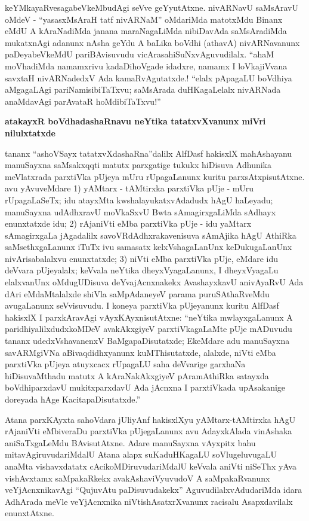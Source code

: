 keYMkayaRvesagabeVkeMbudAgi seVve geYyutAtxne. nivARNavU saMsAravU oMdeV - ``yasasxMsAraH tatf \hbox{nivARNaM}'' oMdariMda matotxMdu Binanx eMdU A kAraNadiMda janana maraNagaLiMda nibiDavAda saMsAradiMda mukatxnAgi adanunx nAsha geYdu A baLika boVdhi (athavA) nivARNavanunx paDeyabeVkeMdU pariBAvisuvudu vicArasahiSuNxvAguvudilalx. ``ahaM moVhadiMda namamxrivu kadaDihoVgade idadxre, namamx I loVkajiVvana savxtaH nivARNadedxV Ada kamaR\-vAgutatxde.! ``elalx pApagaLU boVdhiya aMgagaLAgi pariNamisibiTaTxvu; saMsArada duHKagaLelalx nivARNada anaMdavAgi parAvataR hoMdibiTaTxvu!''

\smallskip
\begin{center}
{\Large\bf atakayxR boVdhadashaRnavu neYtika tatatxvXvanunx miVri nilulxtatxde}
\end{center}

tananx ``ashoVSayx tatatxvXdashaRna''dalilx AlfDasf hakisxlX mahAshayanu manuSayxna saMsakxqqti matutx parxgatige tukukx hiDisuva Adhunika meVlatxrada parxtiVka pUjeya mUru rUpagaLanunx kuritu parxsAtxpisutAtxne. avu yAvuveMdare {\rm 1)} yAMtarx - tAMtirxka parxtiVka pUje - mUru rUpagaLaSeTx; idu atayxMta kwshalayukatxvAdadudx hAgU haLeyadu; manuSayxna udAdhxravU moVkaSxvU Bwta sAmagirxgaLiMda sAdhayx enunxtatxde idu; {\rm 2)} rAjaniVti eMba parxtiVka pUje - idu yaMtarx sAmagirxgaLa jAgadalilx savoVRdAdhxrakavenisuva sAmAjika hAgU AthiRka saMsethxgaLanunx iTuTx ivu samasatx kelxVshagaLanUnx keDukugaLanUnx nivArisabalalxvu enunxtatxde; {\rm 3)} niVti eMba parxtiVka pUje, eMdare idu deVvara pUjeyalalx; keVvala neYtika dheyxVyagaLanunx, I dheyxVyagaLu elalxvanUnx oMdugUDisuva deYvajAcnxnakekx AvashayxkavU anivAyaRvU Ada dAri eMdaMtalalxde shiVla saMpAdaneyeV parama puruSAthaRveMdu avugaLanunx seVvisuvudu. I koneya parxtiVka pUjeyanunx kuritu AlfDasf hakisxlX I parxkAravAgi vAyxKAyxnisutAtxne: ``neYtika mwlayxgaLanunx A paridhiyalilxdudxkoMDeV avakAkxgiyeV parxtiVkagaLaMte pUje mADuvudu tananx udedxVshavanenxV BaMgapaDisutatxde; EkeMdare adu manuSayxna savARMgiVNa aBivaqdidhxyanunx kuMThisutatxde, alalxde, niVti eMba parxtiVka pUjeya atuyxcacx rUpagaLU saha deVvarige garxhaNa hiDisuvaMthadu matutx A kAraNakAkxgiyeV pAramAthiRka satayxda boVdhiparxdavU mukitxparxdavU Ada jAcnxna I parxtiVkada upAsakanige doreyada hAge KacitapaDisutatxde.''

Atana parxKAyxta sahoVdara jUliyAnf hakisxlXyu yAMtarx-tAMtirxka hAgU rAjaniVti eMbiveraDu parxtiVka pUjegaLanunx avu AdayxkAlada vinAshaka aniSaTxgaLeMdu BAvisutAtxne. Adare manuSayxna vAyxpitx bahu mitavAgiruvudariMdalU Atana alapx suKaduHKagaLU soVlugeluvugaLU anaMta vishavxdatatx cAcikoMDiruvudariMdalU keVvala aniVti niSeThx yAva vishAvxtamx saMpakaRkekx avakAshaviVyuvudoV A saMpakaRvanunx veYjAcnxnikavAgi ``QujuvAtu paDisuvudakekx'' AguvudilalxvAdudariMda idara AdhArada meVle veYjAcnxnika niVtishAsatxrXvanunx racisalu Asapxdavilalx enunxtAtxne.

